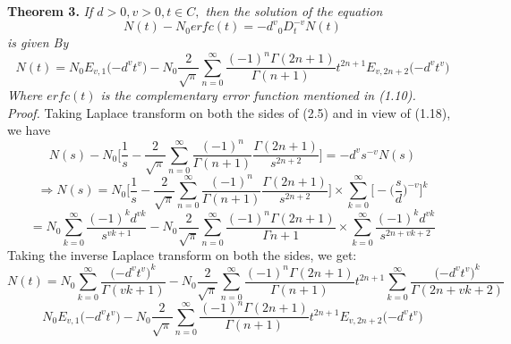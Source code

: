 \documentclass[leqno]{article}
\begin{document}
\noindent
{\bf Theorem 3.}
{\it 
If $d > 0, v > 0, t \in C,$ then the solution of the equation
\begin{equation}
    N(t) - N_0erfc(t) = {-d^v}{_0D_t^{-v}}N(t)
\end{equation}
is given By
\begin{equation}
    N(t) = N_0E_{v,1}
    \Big({-d^v}{t^v}\Big)
    -{N_0}\frac{2}{\sqrt{\pi}}
    \sum_{n = 0}^{\infty}
    \frac{{(-1)^n}\Gamma{(2n+1)}}{\Gamma{(n+1)}}
    t^{2n+1}
    E_{v,2n+2}
    \Big({-d^v}{t^v}\Big)
\end{equation}
Where $erfc(t)$ is the complementary error function mentioned in (1.10).
}
\vspace{0.05in}\\
%
\noindent
{\it Proof.} Taking Laplace transform on both the sides of (2.5) and in view of (1.18), we have
\begin{equation*}
    N(s) - N_0
    \bigg[
        \frac{1}{s}
        -\frac{2}{\sqrt{\pi}}
        \sum_{n = 0}^{\infty}
        \frac{{(-1)^n}}{\Gamma{(n+1)}}
        \frac{\Gamma{(2n+1)}}{s^{2n+2}}
    \bigg]
    ={-d^v}{s^{-v}}N(s)
\end{equation*}
\begin{equation*}
    \Rightarrow N(s) = N_0
    \bigg[
        \frac{1}{s}
        -\frac{2}{\sqrt{\pi}}
        \sum_{n = 0}^{\infty}
        \frac{{(-1)^n}}{\Gamma{(n+1)}}
        \frac{\Gamma{(2n+1)}}{s^{2n+2}}
    \bigg]
    \times \sum_{k = 0}^{\infty}
    \bigg[
        -{\bigg(\frac{s}{d}\bigg)^{-v}}
    \bigg]^k
\end{equation*}
\begin{equation*}
    =N_0
    \sum_{k = 0}^{\infty}
    \frac{{(-1)^k}{d^{vk}}}{s^{vk+1}}
    -N_0\frac{2}{\sqrt{\pi}}
    \sum_{n = 0}^{\infty}
    \frac{(-1)^n \Gamma{(2n+1)}}{\Gamma{n+1}}
    \times \sum_{k = 0}^{\infty}
    \frac{(-1)^k {d^{vk}}}{s^{2n+vk+2}}
\end{equation*}
Taking the inverse Laplace transform on both the sides, we get:
\begin{equation*}
    N(t) = N_0
    \sum_{k = 0}^{\infty}
    \frac{\big({-d^v}{t^v}\big)^k}{\Gamma{(vk+1)}}
    -{N_0}\frac{2}{\sqrt{\pi}}
    \sum_{n = 0}^{\infty}
    \frac{{(-1)^n}\Gamma{(2n+1)}}{\Gamma{(n+1)}}
    t^{2n+1}
    \sum_{k = 0}^{\infty}
    \frac{\big({-d^v}{t^v}\big)^k}{\Gamma{(2n+{vk}+2)}}
\end{equation*}
\begin{equation*}
    N_0E_{v,1}
    \big({-d^v}{t^v}\big)
    -N_0\frac{2}{\sqrt{\pi}}
    \sum_{n = 0}^{\infty}
    \frac{(-1)^n \Gamma{(2n+1)}}{\Gamma{(n+1)}}
    t^{2n+1} E_{v, 2n+2}
    \big({-d^v}{t^v}\big)
\end{equation*}
\end{document}
